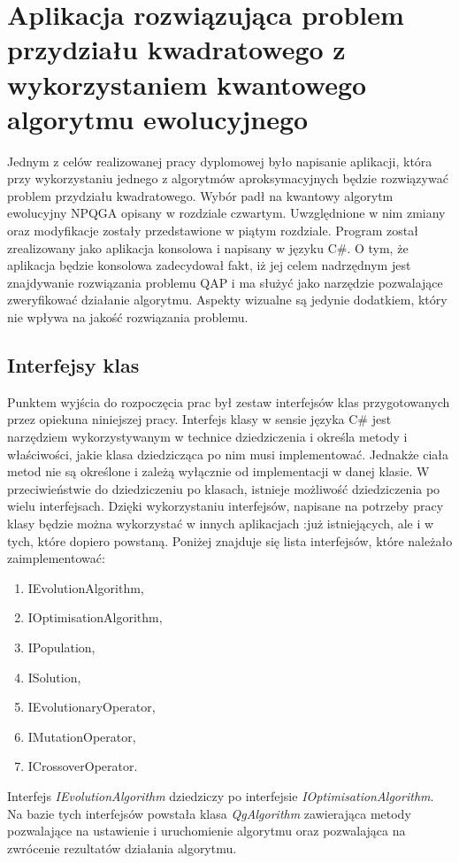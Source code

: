 \chapter{Aplikacja rozwiązująca problem przydziału kwadratowego z wykorzystaniem kwantowego algorytmu ewolucyjnego}
\label{cha:aplikacja}
Jednym z celów realizowanej pracy dyplomowej było napisanie aplikacji, która przy wykorzystaniu jednego z algorytmów aproksymacyjnych będzie rozwiązywać problem przydziału kwadratowego. Wybór padł na kwantowy algorytm ewolucyjny NPQGA opisany w rozdziale czwartym. Uwzględnione w nim zmiany oraz modyfikacje zostały przedstawione w piątym rozdziale. Program został zrealizowany jako aplikacja konsolowa i napisany w języku C\#. O tym, że aplikacja będzie konsolowa zadecydował fakt, iż jej celem nadrzędnym jest znajdywanie rozwiązania problemu QAP i ma służyć jako narzędzie pozwalające zweryfikować działanie algorytmu. Aspekty wizualne są jedynie dodatkiem, który nie wpływa na jakość rozwiązania problemu.

\section{Interfejsy klas}
Punktem wyjścia do rozpoczęcia prac był zestaw interfejsów klas przygotowanych przez opiekuna niniejszej pracy. Interfejs klasy w sensie języka C\# jest narzędziem wykorzystywanym w technice dziedziczenia i określa metody i właściwości, jakie klasa dziedzicząca po nim musi implementować. Jednakże ciała metod nie są określone i zależą wyłącznie od implementacji w danej klasie. W przeciwieństwie do dziedziczeniu po klasach, istnieje możliwość dziedziczenia po wielu interfejsach. Dzięki wykorzystaniu interfejsów, napisane na potrzeby pracy klasy będzie można wykorzystać w innych aplikacjach :już istniejących, ale i w tych, które dopiero powstaną. Poniżej znajduje się lista interfejsów, które należało zaimplementować:
\begin{enumerate}
\item IEvolutionAlgorithm,
\item IOptimisationAlgorithm,
\item IPopulation,
\item ISolution,
\item IEvolutionaryOperator,
\item IMutationOperator,
\item ICrossoverOperator.
\end{enumerate}

Interfejs \textit{IEvolutionAlgorithm} dziedziczy po interfejsie \textit{IOptimisationAlgorithm}. Na bazie tych interfejsów powstała klasa \textit{QgAlgorithm} zawierająca metody pozwalające na ustawienie i uruchomienie algorytmu oraz pozwalająca na zwrócenie rezultatów działania algorytmu.

